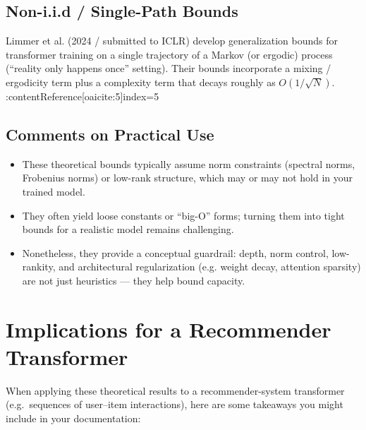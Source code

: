 \documentclass[11pt]{article}
\begin{document}
\begin{itemorem}
\subsection{Non-i.i.d / Single-Path Bounds}
Limmer et al. (2024 / submitted to ICLR) develop generalization bounds for transformer training on a single trajectory of a Markov (or ergodic) process (“reality only happens once” setting). Their bounds incorporate a mixing / ergodicity term plus a complexity term that decays roughly as \(O(1/\sqrt{N})\). :contentReference[oaicite:5]{index=5}  

\subsection{Comments on Practical Use}
\begin{itemize}
  \item These theoretical bounds typically assume norm constraints (spectral norms, Frobenius norms) or low-rank structure, which may or may not hold in your trained model.  
  \item They often yield loose constants or “big-O” forms; turning them into tight bounds for a realistic model remains challenging.  
  \item Nonetheless, they provide a conceptual guardrail: depth, norm control, low-rankity, and architectural regularization (e.g. weight decay, attention sparsity) are not just heuristics — they help bound capacity.  
\end{itemize}

\section{Implications for a Recommender Transformer}
When applying these theoretical results to a recommender-system transformer (e.g.\ sequences of user–item interactions), here are some takeaways you might include in your documentation:


\end{itemorem}
\end{document}
